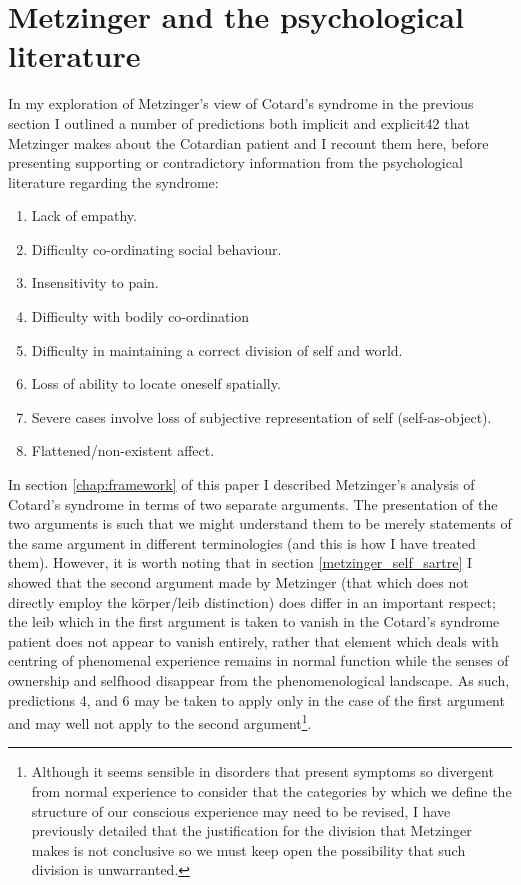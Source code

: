 \section{Metzinger and the psychological literature}
\label{psych_lit_metzinger}

In my exploration of Metzinger's view of Cotard's syndrome in the previous section I outlined a number of predictions both implicit and explicit42 that Metzinger makes about the Cotardian patient and I recount them here, before presenting supporting or contradictory information from the psychological literature regarding the syndrome:

\begin{enumerate}
    \item Lack of empathy.
    \item Difficulty co-ordinating social behaviour.
    \item Insensitivity to pain.
    \item Difficulty with bodily co-ordination
    \item Difficulty in maintaining a correct division of self
    and world.
    \item Loss of ability to locate oneself spatially.
    \item Severe cases involve loss of subjective representation
    of self (self-as-object).
    \item Flattened/non-existent affect.
\end{enumerate}

In section \ref{chap:framework} of this paper I described Metzinger's analysis of Cotard's syndrome in terms of two separate arguments. The presentation of the two arguments is such that we might understand them to be merely statements of the same argument in different terminologies (and this is how I have treated them). However, it is worth noting that in section \ref{metzinger_self_sartre} I showed that the second argument made by Metzinger (that which does not directly employ the k\"{o}rper/leib distinction) does differ in an important respect; the leib which in the first argument is taken to vanish in the Cotard's syndrome patient does not appear to vanish entirely, rather that element which deals with centring of phenomenal experience remains in normal function while the senses of ownership and selfhood disappear from the phenomenological landscape. As such, predictions 4, and 6 may be taken to apply only in the case of the first argument and may well not apply to the second argument\footnote{Although it seems sensible in disorders that present symptoms so divergent from normal experience to consider that the categories by which we define the structure of our conscious experience may need to be revised, I have previously detailed that the justification for the division that Metzinger makes is not conclusive so we must keep open the possibility that such division is unwarranted.}.

